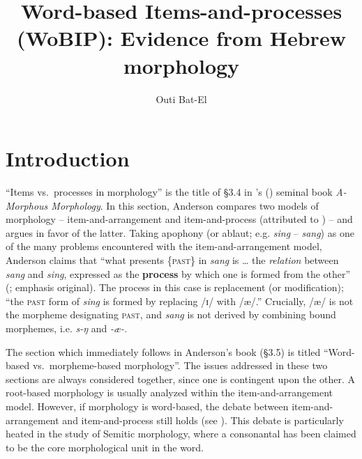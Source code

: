 \documentclass[output=paper,
modfonts
]{LSP/langsci}
\title{Word-based Items-and-processes (WoBIP): Evidence from Hebrew morphology}
\author{Outi Bat-El
	\affiliation{Tel-Aviv University}}
\begin{document}
	\maketitle
	
	
	\section{Introduction}\label{introductionB}
	
	``Items vs.\ processes in morphology'' is the title of \S3.4 in
\citeauthor{anderson1992}'s (\citeyear{anderson1992}) seminal book \emph{A-Morphous Morphology}. In this
section, Anderson compares two models of morphology --
item-and-arrangement and item-and-process (attributed to \citealt{Hockett1954})
-- and argues in favor of the latter. Taking apophony (or ablaut; e.g.
\emph{sing} -- \emph{sang}) as one of the many problems encountered with
the item-and-arrangement model, Anderson claims that ``what presents
\{\textsc{past}\} in \emph{sang} is \ldots{} the \emph{relation} between
\emph{sang} and \emph{sing}, expressed as the \textbf{process} by which
one is formed from the other'' (\citealt[62]{anderson1992}; emphasis original).
The process in this case is replacement (or  modification); ``the
\textsc{past} form of \emph{sing} is formed by replacing /ɪ/ with /æ/.'' Crucially, /æ/ is not the morpheme designating \textsc{past},
and \emph{sang} is not derived by combining bound morphemes, i.e.
\emph{s-ŋ} and \emph{-æ-}.

The section which  immediately follows in Anderson's book (\S3.5) is titled
``Word-based vs.\ mor\-pheme-based morphology''. The issues addressed in
these two sections are always considered together, since one is
contingent upon the other. A root-based morphology is usually analyzed
within the item-and-arrangement model. However, if morphology is
word-based, the debate between item-and-arrangement and item-and-process
still holds (see ). This debate is particularly heated in the study of
Semitic morphology, where a consonantal  has been claimed to be the
core morphological unit in the word.
\end{document}
